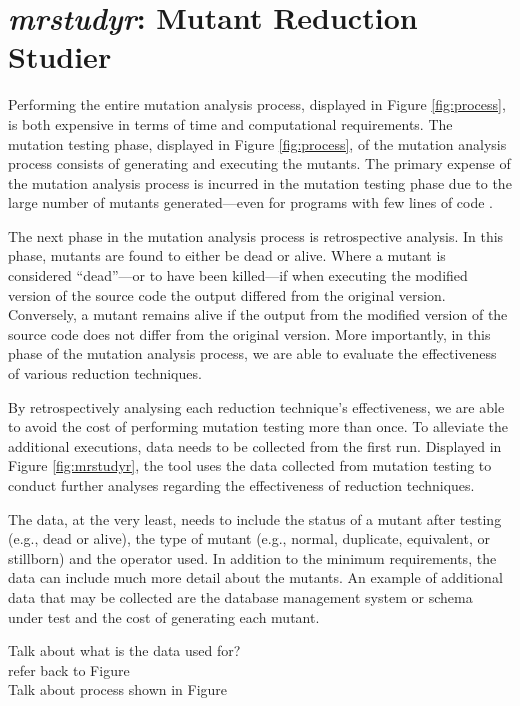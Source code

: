 

\section{\textit{mrstudyr}: Mutant Reduction Studier}

Performing the entire mutation analysis process, displayed in Figure \ref{fig:process},
is both expensive in terms of time and computational requirements. The mutation testing
phase, displayed in Figure \ref{fig:process}, of the mutation analysis
process consists of generating and executing the mutants. The primary
expense of the mutation analysis process is incurred in the mutation testing phase
due to the large number of mutants generated---even for programs with few lines of code \cite{offutt2001mutation}.

The next phase in the mutation analysis process is retrospective analysis. In this
phase, mutants are found to either be dead or alive. Where a mutant is considered
``dead''---or to have been killed---if when executing the modified version of the source
code the output differed from the original version. Conversely, a mutant remains alive
if the output from the modified version of the source code does not differ from the
original version. More importantly, in this phase of the mutation analysis process,
we are able to evaluate the effectiveness of various reduction techniques.

By retrospectively analysing each reduction technique's effectiveness, we are
able to avoid the cost of performing mutation testing more than once. To alleviate
the additional executions, data needs to be collected
from the first run. Displayed in Figure \ref{fig:mrstudyr},
the \mr tool uses the data collected from mutation testing to conduct further analyses
regarding the effectiveness of reduction techniques.

The data, at the very least, needs to include the status of
a mutant after testing (e.g., dead or alive), the type of mutant (e.g., normal, duplicate, equivalent, or stillborn)
and the operator used. In addition to the minimum requirements, the data can include much
more detail about the mutants. An example of additional data that may be collected are the database
management system or schema under test and the cost of generating each mutant.

Talk about what is the data used for? \\
refer back to Figure \\
Talk about process shown in Figure

